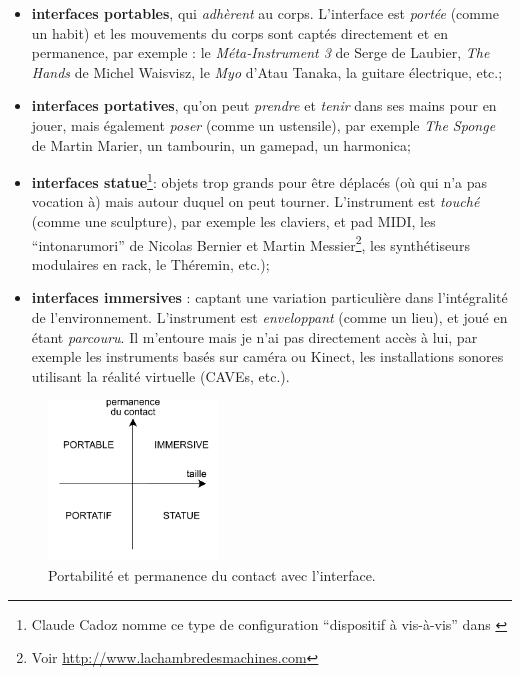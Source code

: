 \vspace{-1em}
\begin{itemize}[noitemsep]
	\item \textbf{interfaces portables}, qui \textit{adhèrent} au corps. L'interface est \textit{portée} (comme un habit) et les mouvements du corps sont captés directement et en permanence, par exemple : le \textit{Méta-Instrument 3} de Serge de Laubier, \textit{The Hands} de Michel Waisvisz, le \textit{Myo} d'Atau Tanaka, la guitare électrique, etc.;
	\item \textbf{interfaces portatives}, qu'on peut \textit{prendre} et \textit{tenir} dans ses mains pour en jouer, mais également \textit{poser} (comme un ustensile), par exemple \textit{The Sponge} de Martin Marier, un tambourin, un gamepad, un harmonica;
	\item \textbf{interfaces statue}\footnote{Claude Cadoz nomme ce type de configuration ``dispositif à vis-à-vis'' dans \cite{cadoz_geste_1994}}: objets trop grands pour être déplacés (où qui n'a pas vocation à) mais autour duquel on peut tourner. L'instrument est \textit{touché} (comme une sculpture), par exemple les claviers, et pad \gls{MIDI}, les ``intonarumori'' de Nicolas Bernier et Martin Messier\footnote{Voir \url{http://www.lachambredesmachines.com}}, les synthétiseurs modulaires en rack, le Théremin, etc.);
	\item \textbf{interfaces immersives} : captant une variation particulière dans l'intégralité de l'environnement. L'instrument est \textit{enveloppant} (comme un lieu), et joué en étant \textit{parcouru}. Il m'entoure mais je n'ai pas directement accès à lui, par exemple les instruments basés sur caméra ou Kinect, les installations sonores utilisant la réalité virtuelle (CAVEs, etc.).
\end{itemize}
\clearpage
\begin{figure}
	\vspace{-0.em}
	\captionsetup{format=plain}
	\centering
 	\includegraphics[width=0.4\textwidth]{gfx/05_interfaces/interface-portabilite.pdf}
	\caption[Portabilité et permanence du contact avec l'interface.]{Portabilité et permanence du contact avec l'interface.}
 	\label{fig:interfaces:portabilite}
\end{figure}

